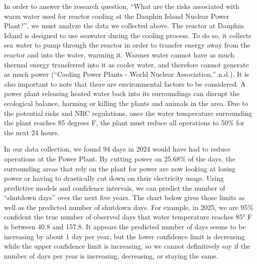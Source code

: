 \documentclass[
  letterpaper,
  DIV=11,
  numbers=noendperiod]{scrreprt}
\begin{document}
In order to answer the research question, ``What are the risks
associated with warm water used for reactor cooling at the Dauphin
Island Nuclear Power Plant?'', we must analyze the data we collected
above. The reactor at Dauphin Island is designed to use seawater during
the cooling process. To do so, it collects sea water to pump through the
reactor in order to transfer energy away from the reactor and into the
water, warming it. Warmer water cannot have as much thermal energy
transferred into it as cooler water, and therefore cannot generate as
much power ({``Cooling Power Plants - World Nuclear Association,''}
n.d.). It is also important to note that there are environmental factors
to be considered. A power plant releasing heated water back into its
surroundings can disrupt the ecological balance, harming or killing the
plants and animals in the area. Due to the potential risks and NRC
regulations, once the water temperature surrounding the plant reaches 85
degrees F, the plant must reduce all operations to 50\% for the next 24
hours.

In our data collection, we found 94 days in 2024 would have had to
reduce operations at the Power Plant. By cutting power on 25.68\% of the
days, the surrounding areas that rely on the plant for power are now
looking at losing power or having to drastically cut down on their
electricity usage. Using predictive models and confidence intervals, we
can predict the number of ``shutdown days'' over the next five years.
The chart below gives those limits as well as the predicted number of
shutdown days. For example, in 2025, we are 95\% confident the true
number of observed days that water temperature reaches 85° F is between
40.8 and 157.8. It appears the predicted number of days seems to be
increasing by about 1 day per year, but the lower confidence limit is
decreasing while the upper confidence limit is increasing, so we cannot
definitively say if the number of days per year is increasing,
decreasing, or staying the same.
\end{document}
